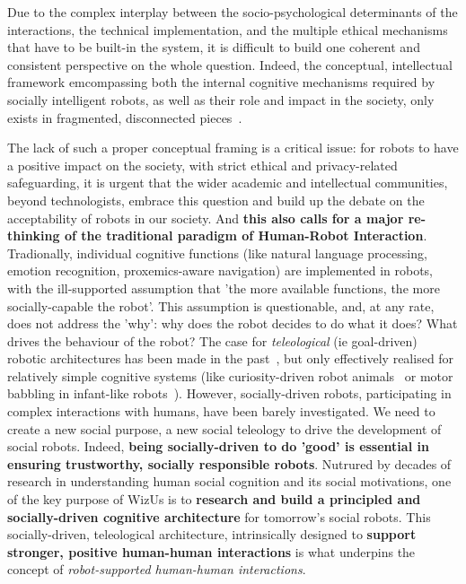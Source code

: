 \documentclass[11pt,a4paper]{report}
\newcommand{\project}{WizUs\xspace}
\begin{document}
Due to the complex interplay between the socio-psychological determinants of the
interactions, the technical implementation, and the multiple ethical mechanisms
that have to be built-in the system, it is difficult to build one coherent and
consistent perspective on the whole question. Indeed, the conceptual,
intellectual framework emcompassing both the internal cognitive mechanisms
required by socially intelligent robots, as well as their role and impact in the
society, only exists in fragmented, disconnected pieces~\cite{citeneeded}.


The lack of such a proper conceptual framing is a critical issue: for robots to
have a positive impact on the society, with strict ethical and privacy-related
safeguarding, it is urgent that the wider academic and intellectual communities,
beyond technologists, embrace this question and build up the debate on the
acceptability of robots in our society. And \textbf{this also calls for a major
re-thinking of the traditional paradigm of Human-Robot Interaction}.
Tradionally, individual cognitive functions (like natural language processing,
emotion recognition, proxemics-aware navigation) are implemented in robots, with
the ill-supported assumption that 'the more available functions, the more
socially-capable the robot'. This assumption is questionable, and, at any rate,
does not address the 'why': why does the robot decides to do what it does? What
drives the behaviour of the robot? The case for \emph{teleological} (ie
goal-driven) robotic architectures has been made in the
past~\cite{wrede2012towards}, but only effectively realised for relatively
simple cognitive systems (like curiosity-driven robot
animals~\cite{oudeyer2005playground} or motor babbling in infant-like
robots~\cite{forestier2017unified}). However, socially-driven robots,
participating in complex interactions with humans, have been barely
investigated. We need to create a new social purpose, a new social teleology to
drive the development of social robots.  Indeed, \textbf{being socially-driven
to do 'good' is essential in ensuring trustworthy, socially responsible robots}.
Nutrured by decades of research in understanding human social cognition and its
social motivations, one of the key purpose of \project is to \textbf{research
and build a principled and socially-driven cognitive architecture} for
tomorrow's social robots. This socially-driven, teleological architecture,
intrinsically designed to \textbf{support stronger, positive human-human
interactions} is what underpins the concept of \emph{robot-supported human-human
interactions}.
\end{document}
